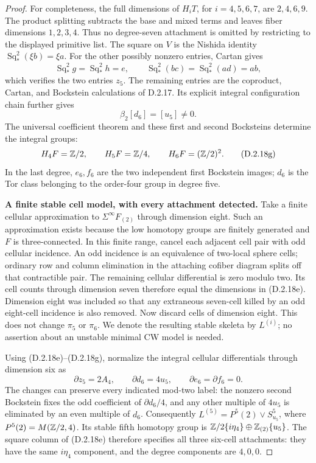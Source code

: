 \begin{proof}
For completeness, the full dimensions of $H_iT$, for
$i=4,5,6,7$, are $2,4,6,9$. The product splitting subtracts
the base and mixed terms and leaves fiber dimensions $1,2,3,4$.
Thus no degree-seven attachment is omitted by restricting to
the displayed primitive list. The square on $V$ is the Nishida
identity $\operatorname{Sq}_*^2(\xi b)=\xi a$. For the other
possibly nonzero entries, Cartan gives
\[
 \operatorname{Sq}_*^2g=\operatorname{Sq}_*^2h=e,
 \qquad
 \operatorname{Sq}_*^2(bc)=\operatorname{Sq}_*^2(ad)=ab,
\]
which verifies the two entries $z_5$. The remaining entries
are the coproduct, Cartan, and Bockstein calculations of D.2.17.
Its explicit integral configuration chain further gives
\[
 \beta_2[d_6]=[u_5]\ne0.
 \tag{D.2.18f}
\]
The universal coefficient theorem and these first and second
Bocksteins determine the integral groups:
\[
 H_4F=\mathbb Z/2,\qquad H_5F=\mathbb Z/4,\qquad
 H_6F=(\mathbb Z/2)^2.
 \tag{D.2.18g}
\]
In the last degree, $e_6,f_6$ are the two independent first
Bockstein images; $d_6$ is the Tor class belonging to the
order-four group in degree five.

\medskip\noindent
\textbf{A finite stable cell model, with every attachment detected.}
Take a finite cellular approximation to
$\Sigma^\infty F_{(2)}$ through dimension eight. Such an
approximation exists because the low homotopy groups are finitely
generated and $F$ is three-connected. In this finite range,
cancel each adjacent cell pair with odd cellular incidence.
An odd incidence is an equivalence of two-local sphere cells;
ordinary row and column elimination in the attaching cofiber
diagram splits off that contractible pair. The remaining
cellular differential is zero modulo two. Its cell counts
through dimension seven therefore equal the dimensions in
\textup{(D.2.18e)}. Dimension eight was included so that any
extraneous seven-cell killed by an odd eight-cell incidence is
also removed. Now discard cells of dimension eight. This does
not change $\pi_5$ or $\pi_6$. We denote the resulting stable
skeleta by $L^{(i)}$; no assertion about an unstable minimal
CW model is needed.

Using \textup{(D.2.18e)--(D.2.18g)}, normalize the integral
cellular differentials through dimension six as
\[
 \partial z_5=2A_4,\qquad \partial d_6=4u_5,
 \qquad \partial e_6=\partial f_6=0.
 \tag{D.2.18h}
\]
The changes can preserve every indicated mod-two label:
the nonzero second Bockstein fixes the odd coefficient of
$\partial d_6/4$, and any other multiple of $4u_5$ is eliminated
by an even multiple of $d_6$. Consequently
$L^{(5)}=P^5(2)\vee S^5_{u_5}$, where
$P^5(2)=M(\mathbb Z/2,4)$. Its stable fifth homotopy group is
$\mathbb Z/2\{i\eta_4\}\oplus\mathbb Z_{(2)}\{u_5\}$.
The square column of \textup{(D.2.18e)} therefore specifies
all three six-cell attachments: they have the same
$i\eta_4$ component, and the degree components are $4,0,0$.


\end{proof}
